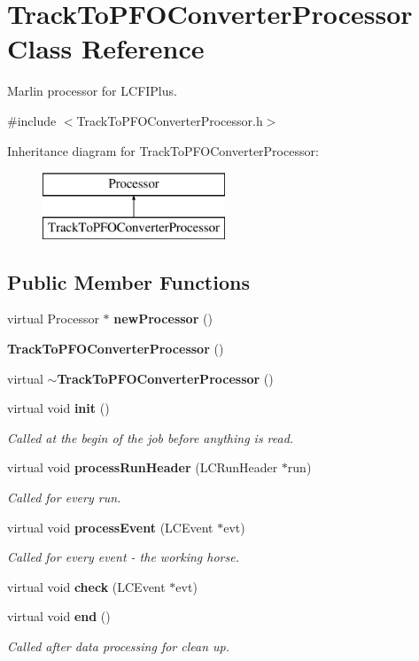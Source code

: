 \section{Track\+To\+P\+F\+O\+Converter\+Processor Class Reference}
\label{classTrackToPFOConverterProcessor}


Marlin processor for L\+C\+F\+I\+Plus.  




{\ttfamily \#include $<$Track\+To\+P\+F\+O\+Converter\+Processor.\+h$>$}

Inheritance diagram for Track\+To\+P\+F\+O\+Converter\+Processor\+:\begin{figure}[H]
\begin{center}
\leavevmode
\includegraphics[height=2.000000cm]{classTrackToPFOConverterProcessor}
\end{center}
\end{figure}
\subsection*{Public Member Functions}
\begin{DoxyCompactItemize}
\item 
virtual Processor $\ast$ \textbf{ new\+Processor} ()
\item 
\textbf{ Track\+To\+P\+F\+O\+Converter\+Processor} ()
\item 
virtual \textbf{ $\sim$\+Track\+To\+P\+F\+O\+Converter\+Processor} ()
\item 
virtual void \textbf{ init} ()
\begin{DoxyCompactList}\small\item\em Called at the begin of the job before anything is read. \end{DoxyCompactList}\item 
virtual void \textbf{ process\+Run\+Header} (L\+C\+Run\+Header $\ast$run)
\begin{DoxyCompactList}\small\item\em Called for every run. \end{DoxyCompactList}\item 
virtual void \textbf{ process\+Event} (L\+C\+Event $\ast$evt)
\begin{DoxyCompactList}\small\item\em Called for every event -\/ the working horse. \end{DoxyCompactList}\item 
virtual void \textbf{ check} (L\+C\+Event $\ast$evt)
\item 
virtual void \textbf{ end} ()
\begin{DoxyCompactList}\small\item\em Called after data processing for clean up. \end{DoxyCompactList}\end{DoxyCompactItemize}


